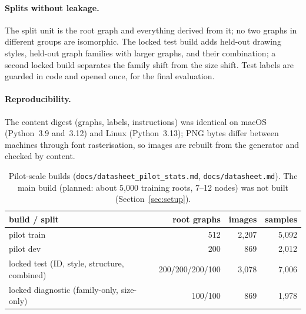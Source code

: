 \paragraph{Splits without leakage.}
The split unit is the root graph and everything derived from it; no two graphs in
different groups are isomorphic. The locked test build adds held-out drawing styles,
held-out graph families with larger graphs, and their combination; a second locked build
separates the family shift from the size shift. Test labels are guarded in code and opened
once, for the final evaluation.

\paragraph{Reproducibility.}
The content digest (graphs, labels, instructions) was identical on macOS (Python~3.9 and~3.12)
and Linux (Python~3.13); PNG bytes differ between machines through font
rasterisation, so images are rebuilt from the generator and checked by content.

\begin{table}[h]
\centering
\begin{tabular}{lrrr}
\toprule
build / split & root graphs & images & samples \\
\midrule
pilot train & 512 & 2{,}207 & 5{,}092 \\
pilot dev & 200 & 869 & 2{,}012 \\
locked test (ID, style, structure, combined) & 200/200/200/100 & 3{,}078 & 7{,}006 \\
locked diagnostic (family-only, size-only) & 100/100 & 869 & 1{,}978 \\
\bottomrule
\end{tabular}
\caption{Pilot-scale builds (\texttt{docs/datasheet\_pilot\_stats.md}, \texttt{docs/datasheet.md}).
The main build (planned: about 5{,}000 training roots, 7--12 nodes) was not built (Section~\ref{sec:setup}).}
\end{table}
